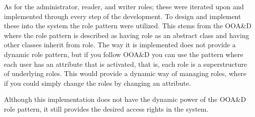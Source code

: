 
As for the administrator, reader, and writer roles; these were iterated upon and implemented through every step of the development.
To design and implement these into the system the role pattern were utilized.
This stems from the OOA\&D where the role pattern is described as having role as an abstract class and having other classes inherit from role.
The way it is implemented does not provide a dynamic role pattern, but if you follow OOA\&D you can use the pattern where each user has an attribute that is activated, that is, each role is a superstructure of underlying roles.
This would provide a dynamic way of managing roles, where if you could simply change the roles by changing an attribute.

Although this implementation does not have the dynamic power of the OOA\&D role pattern, it still provides the desired access rights in the system.
